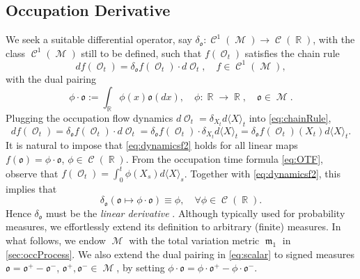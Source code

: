 \documentclass[11pt]{article}
\def\mo{\mathfrak{o}}
\theoremstyle{plain}
\theoremstyle{definition}
\DeclareMathOperator{\R}{\mathbb{R}}
\DeclareMathOperator{\calC}{\mathcal{C}}
\DeclareMathOperator{\calM}{\mathcal{M}}
\DeclareMathOperator{\calO}{\mathcal{O}}
\DeclareMathOperator{\frakm}{\mathfrak{m}}
\begin{document}
\subsection{Occupation Derivative}\label{sec:occDerivative}
We seek a suitable 
differential operator, say $\delta_\mo :\calC^1(\calM) \to \calC(\R)$, with the class  $\calC^1(\calM)$ still to be defined,  
such that $f(\calO_t)$ satisfies the chain rule
\begin{equation}\label{eq:chainRule}
    df(\calO_{t})  = \delta_\mo f(\calO_t) \cdot  d\calO_t, \quad f\in \calC^{1}(\calM),
\end{equation}
with the dual pairing 
\begin{equation}\label{eq:scalar}
    \phi \cdot \mo := \int_{\R} \phi(x)\mo(dx), \quad \phi:\R\to \R, \quad \mo \in \calM. 
\end{equation}
Plugging  the occupation flow dynamics $d\calO_t = \delta_{X_t}d\langle X \rangle_t$ into \eqref{eq:chainRule}, 
\begin{equation}\label{eq:dynamicsf2}
    df(\calO_t) = \delta_{\mo}f(\calO_t) \cdot d\calO_t = \delta_\mo f(\calO_t) \cdot \delta_{X_t}d\langle X \rangle_t = \delta_\mo f(\calO_t)(X_t)d\langle X \rangle_t. 
\end{equation}
It is natural to impose that \eqref{eq:dynamicsf2}   holds  for all linear maps $f(\mo) = \phi\cdot \mo$, $\phi \in \calC(\R)$. From the occupation time formula \eqref{eq:OTF}, observe that  $f(\calO_t) = \int_0^t \phi(X_s) d\langle X \rangle_s$. Together with  \eqref{eq:dynamicsf2},  this implies that  %
\begin{equation}\label{eq:linearFctalCond}
     \delta_{\mo} (\mo \mapsto \phi \cdot \mo) \equiv \phi, 
\quad \forall \phi\in \calC(\R).
\end{equation}
Hence $\delta_{\mo}$ must be  the  \textit{linear derivative} 
\cite{CardDelLasLio,CarmonaDelarue}. 
Although typically used for probability measures, we  effortlessly extend its definition  to arbitrary (finite) measures. 
In what follows, we   endow  $\calM$ 
with the total variation metric $\frakm_1$  in \cref{sec:occProcess}. 
We also extend the dual pairing in \eqref{eq:scalar} to signed measures $\mo = \mo^+ - \mo^-$, $\mo^+, \mo^- \in \calM$, by setting   $\phi \cdot \mo = \phi \cdot \mo^+ - \phi \cdot \mo^-$. 
 
\end{document}
